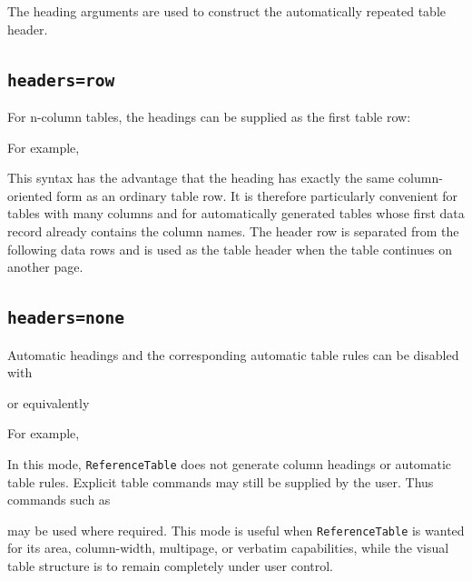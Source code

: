 \documentclass[
11pt,
a4paper,
oneside
]{scrbook}
\begin{document}
The heading arguments are used to construct the automatically repeated table
header.


\subsection{\texttt{headers=row}}

For n-column tables, the headings can be supplied as the first table row:




For example,




This syntax has the advantage that the heading has exactly the same
column-oriented form as an ordinary table row. It is therefore particularly
convenient for tables with many columns and for automatically generated
tables whose first data record already contains the column names.
The header row is separated from the following data rows and is used as the
table header when the table continues on another page.

\subsection{\texttt{headers=none}}

Automatic headings and the corresponding automatic table rules can be
disabled with




or equivalently




For example,




In this mode, \texttt{ReferenceTable} does not generate column headings or
automatic table rules. Explicit table commands may still be supplied by the
user. Thus commands such as




may be used where required.
This mode is useful when \texttt{ReferenceTable} is wanted for its area,
column-width, multipage, or verbatim capabilities, while the visual table
structure is to remain completely under user control.
\end{document}
